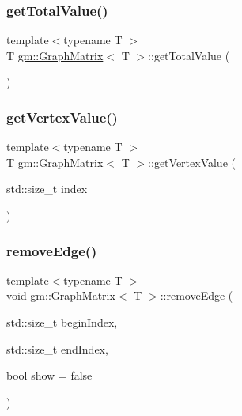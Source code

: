 \mbox{\label{classgm_1_1_graph_matrix_a2dd4beb317ef1742df02eee6581c1194}} 
\subsubsection{\texorpdfstring{get\+Total\+Value()}{getTotalValue()}}
{\footnotesize\ttfamily template$<$typename T $>$ \\
T \mbox{\hyperlink{classgm_1_1_graph_matrix}{gm\+::\+Graph\+Matrix}}$<$ T $>$\+::get\+Total\+Value (\begin{DoxyParamCaption}{ }\end{DoxyParamCaption})}

\mbox{\label{classgm_1_1_graph_matrix_adacccfacb1c46e0fa0ca173846f48a11}} 
\subsubsection{\texorpdfstring{get\+Vertex\+Value()}{getVertexValue()}}
{\footnotesize\ttfamily template$<$typename T $>$ \\
T \mbox{\hyperlink{classgm_1_1_graph_matrix}{gm\+::\+Graph\+Matrix}}$<$ T $>$\+::get\+Vertex\+Value (\begin{DoxyParamCaption}\item[{std\+::size\+\_\+t}]{index }\end{DoxyParamCaption})}

\mbox{\label{classgm_1_1_graph_matrix_aaee8cb1c4d2bab6fcba5f3fc64852bfd}} 
\subsubsection{\texorpdfstring{remove\+Edge()}{removeEdge()}}
{\footnotesize\ttfamily template$<$typename T $>$ \\
void \mbox{\hyperlink{classgm_1_1_graph_matrix}{gm\+::\+Graph\+Matrix}}$<$ T $>$\+::remove\+Edge (\begin{DoxyParamCaption}\item[{std\+::size\+\_\+t}]{begin\+Index,  }\item[{std\+::size\+\_\+t}]{end\+Index,  }\item[{bool}]{show = {\ttfamily false} }\end{DoxyParamCaption})}

